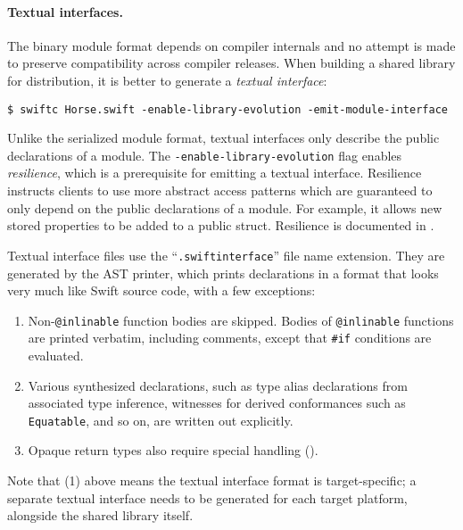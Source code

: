 \documentclass[../generics]{subfiles}
\begin{document}
\paragraph{Textual interfaces.} The binary module format depends on compiler internals and no attempt is made to preserve compatibility across compiler releases. When building a shared library for distribution, it is better to generate a \emph{textual interface}:
\begin{Verbatim}
$ swiftc Horse.swift -enable-library-evolution -emit-module-interface
\end{Verbatim}
Unlike the serialized module format, textual interfaces only describe the public declarations of a module. The \texttt{-enable-library-evolution} flag enables \emph{resilience}, which is a prerequisite for emitting a textual interface. Resilience instructs clients to use more abstract access patterns which are guaranteed to only depend on the public declarations of a module. For example, it allows new stored properties to be added to a public struct. Resilience is documented in \cite{libraryevolution}.

Textual interface files use the ``\texttt{.swiftinterface}'' file name extension. They are generated by the AST printer, which prints declarations in a format that looks very much like Swift source code, with a few exceptions:
\begin{enumerate}
\item Non-\texttt{@inlinable} function bodies are skipped. Bodies of \texttt{@inlinable} functions are printed verbatim, including comments, except that \verb|#if| conditions are evaluated.
\item Various synthesized declarations, such as type alias declarations from associated type inference, witnesses for derived conformances such as \texttt{Equatable}, and so on, are written out explicitly.
\item Opaque return types also require special handling ().
\end{enumerate}
Note that (1) above means the textual interface format is target-specific; a separate textual interface needs to be generated for each target platform, alongside the shared library itself.
\end{document}
